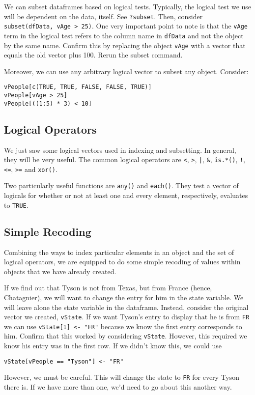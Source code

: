 We can subset dataframes based on logical tests. Typically, the
logical test we use will be dependent on the data, itself. See
\texttt{?subset}. Then, consider \verb=subset(dfData, vAge > 25)=. One
very important point to note is that the \texttt{vAge} term in the
logical test refers to the column name in \texttt{dfData} and not the
object by the same name. Confirm this by replacing the object
\texttt{vAge} with a vector that equals the old vector plus 100. Rerun
the subset command.

Moreover, we can use any arbitrary logical vector to subset any
object. Consider:
\begin{verbatim}
vPeople[c(TRUE, TRUE, FALSE, FALSE, TRUE)]
vPeople[vAge > 25]
vPeople[((1:5) * 3) < 10]
\end{verbatim}

\subsection{Logical Operators}
We just saw some logical vectors used in indexing and subsetting. In
general, they will be very useful. The common logical operators are
\texttt{<}, \texttt{>}, \texttt{|}, \texttt{\&}, \texttt{is.*()},
\texttt{!}, \texttt{<=}, \texttt{>=} and \texttt{xor()}.

Two particularly useful functions are \texttt{any()} and
\texttt{each()}. They test a vector of logicals for whether or not at
least one and every element, respectively, evaluates to \texttt{TRUE}.

\subsection{Simple Recoding}
Combining the ways to index particular elements in an object and the
set of logical operators, we are equipped to do some simple recoding
of values within objects that we have already created.

If we find out that Tyson is not from Texas, but from France (hence,
Chatagnier), we will want to change the entry for him in the state
variable. We will leave alone the state variable in the
dataframe. Instead, consider the original vector we created,
\texttt{vState}. If we want Tyson's entry to display that he is from
\texttt{FR} we can use \verb=vState[1] <- "FR"= because we know the
first entry corresponds to him. Confirm that this worked by
considering \texttt{vState}. However, this required we know his entry
was in the first row. If we didn't know this, we could use
\begin{verbatim}
vState[vPeople == "Tyson"] <- "FR"
\end{verbatim}
However, we must be careful. This will change the state to \texttt{FR}
for every Tyson there is. If we have more than one, we'd need to go
about this another way.

